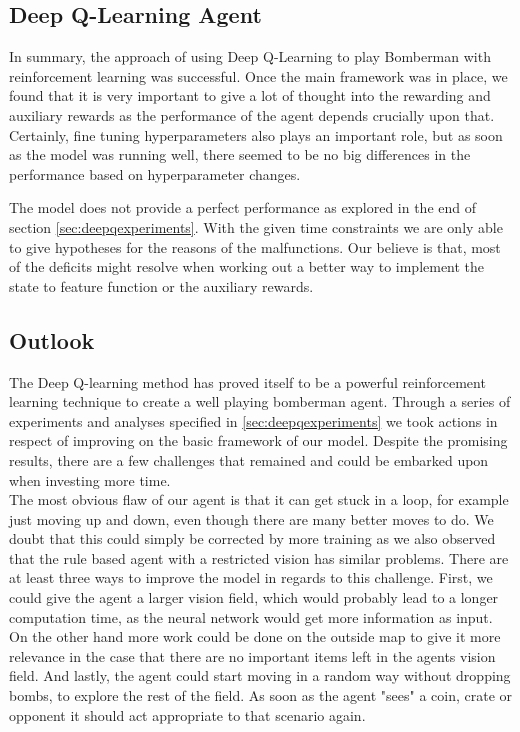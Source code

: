 
\subsection{Deep Q-Learning Agent}

In summary, the approach of using Deep Q-Learning to play Bomberman with reinforcement learning was successful. Once the main framework was in place, we found that it is very important to give a lot of thought into the rewarding and auxiliary rewards as the performance of the agent depends crucially upon that. Certainly, fine tuning hyperparameters also plays an important role, but as soon as the model was running well, there seemed to be no big differences in the performance based on hyperparameter changes.

The model does not provide a perfect performance as explored in the end of section \ref{sec:deepqexperiments}. With the given time constraints we are only able to give hypotheses for the reasons of the malfunctions. Our believe is that, most of the deficits might resolve when working out a better way to implement the state to feature function or the auxiliary rewards.

\subsection{Outlook}

The Deep Q-learning method has proved itself to be a powerful reinforcement learning technique to create a well playing bomberman agent. Through a series of experiments and analyses specified in \ref{sec:deepqexperiments} we took actions in respect of improving on the basic framework of our model. Despite the promising results, there are a few challenges that remained and could be embarked upon when investing more time. \\

The most obvious flaw of our agent is that it can get stuck in a loop, for example just moving up and down, even though there are many better moves to do. We doubt that this could simply be corrected by more training as we also observed that the rule based agent with a restricted vision has similar problems. There are at least three ways to improve the model in regards to this challenge. First, we could give the agent a larger vision field, which would probably lead to a longer computation time, as the neural network would get more information as input. On the other hand more work could be done on the outside map to give it more relevance in the case that there are no important items left in the agents vision field. And lastly, the agent could start moving in a random way without dropping bombs, to explore the rest of the field. As soon as the agent "sees" a coin, crate or opponent it should act appropriate to that scenario again.

